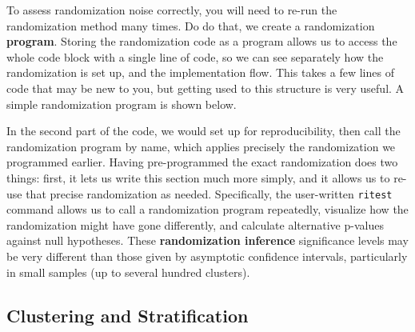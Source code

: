 To assess randomization noise correctly,
you will need to re-run the randomization method many times.
Do do that, we create a randomization \textbf{program}.
Storing the randomization code as a program allows us to access the whole code block
with a single line of code, so we can see separately
how the randomization is set up, and the implementation flow.
This takes a few lines of code that may be new to you,
but getting used to this structure is very useful.
A simple randomization program is shown below.


{
}

In the second part of the code, we would set up for reproducibility,
then call the randomization program by name,
which applies precisely the randomization we programmed earlier.
Having pre-programmed the exact randomization does two things:
first, it lets us write this section much more simply,
and it allows us to re-use that precise randomization as needed.
Specifically, the user-written \texttt{ritest} command
allows us to call a randomization program repeatedly,
visualize how the randomization might have gone differently,
and calculate alternative p-values against null hypotheses.
These \textbf{randomization inference} significance levels may be very different
than those given by asymptotic confidence intervals,
particularly in small samples (up to several hundred clusters).


{
}

\subsection{Clustering and Stratification}

